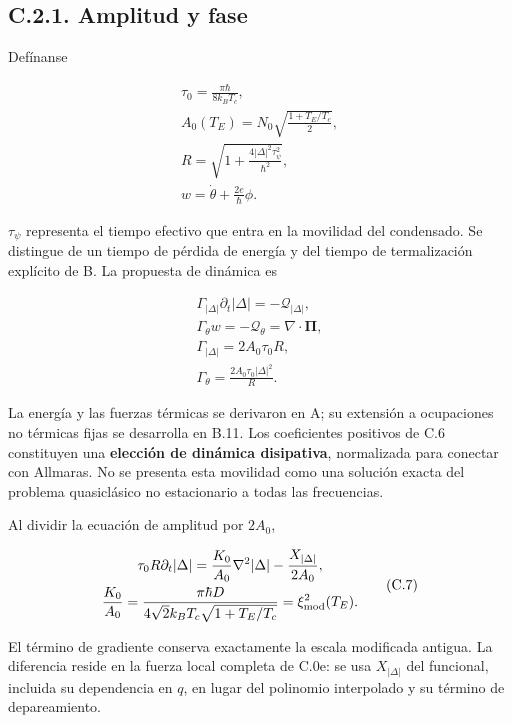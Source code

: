 \documentclass[
  spanish,
  10pt,
  a4paper,
]{article}
\begin{document}
\subsection{C.2.1. Amplitud y fase}\label{c.2.1.-amplitud-y-fase}

Defínanse

\[
\begin{gathered}
\tau_0=\frac{\pi\hbar}{8k_BT_c},\\
A_0(T_E)=N_0\sqrt{\frac{1+T_E/T_c}{2}},\\
R=\sqrt{1+\frac{4|\Delta|^2\tau_\psi^2}{\hbar^2}},\\
w=\dot\theta+\frac{2e}{\hbar}\phi.
\end{gathered} \tag{C.5}
\]

\(\tau_\psi\) representa el tiempo efectivo que entra en la movilidad
del condensado. Se distingue de un tiempo de pérdida de energía y del
tiempo de termalización explícito de B. La propuesta de dinámica es

\[
\begin{gathered}
\Gamma_{|\Delta|}\partial_t|\Delta|=-\mathcal Q_{|\Delta|},\\
\Gamma_\theta w=-\mathcal Q_\theta=\nabla\cdot\boldsymbol\Pi,\\
\Gamma_{|\Delta|}=2A_0\tau_0R,\\
\Gamma_\theta=\frac{2A_0\tau_0|\Delta|^2}{R}.
\end{gathered} \tag{C.6}
\]

La energía y las fuerzas térmicas se derivaron en A; su extensión a
ocupaciones no térmicas fijas se desarrolla en B.11. Los coeficientes
positivos de C.6 constituyen una \textbf{elección de dinámica
disipativa}, normalizada para conectar con Allmaras. No se presenta esta
movilidad como una solución exacta del problema quasiclásico no
estacionario a todas las frecuencias.

Al dividir la ecuación de amplitud por \(2A_0\),

\[
\begin{gathered}
\tau_0R\partial_t|\Delta|=\frac{K_0}{A_0}\nabla^2|\Delta|-\frac{X_{|\Delta|}}{2A_0},\\
\frac{K_0}{A_0}
=\frac{\pi\hbar D}{4\sqrt2 k_BT_c\sqrt{1+T_E/T_c}}
=\xi_{\rm mod}^2(T_E).
\end{gathered} \tag{C.7}
\]

El término de gradiente conserva exactamente la escala modificada
antigua. La diferencia reside en la fuerza local completa de C.0e: se
usa \(X_{|\Delta|}\) del funcional, incluida su dependencia en \(q\), en
lugar del polinomio interpolado y su término de depareamiento.
\end{document}
